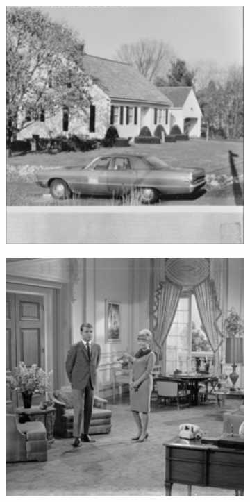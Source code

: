 \begin{figure}
\begin{subfigure}[b]{0.09\textwidth}
    \end{subfigure}
    \hfill
    \begin{subfigure}[b]{0.09\textwidth}
        \centering
        \includegraphics[width=1\textwidth]{images/pgpd/carhouse.png}
    \end{subfigure}
    \hfill
    \begin{subfigure}[b]{0.09\textwidth}
        \centering
        \includegraphics[width=1\textwidth]{images/pgpd/couple.png}

\end{subfigure}
\end{figure}
